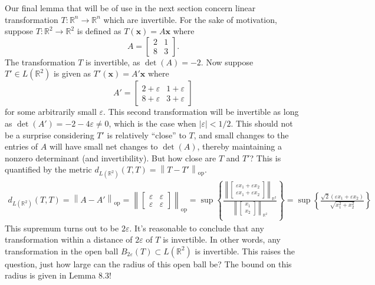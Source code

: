 \documentclass{article}
\newcommand{\R}{\mathbb{R}}
\newcommand{\x}{\mathbf{x}}
\newcommand{\norm}[1]{\left\lVert#1\right\rVert}
\newcommand{\normop}[1]{\left\lVert#1\right\rVert_\text{op}}
\theoremstyle{definition}
\begin{document}
	Our final lemma that will be of use in the next section concern linear transformation $ T:\R^n\to\R^n $ which are invertible. For the sake of motivation, suppose $ T:\R^2\to\R^2 $ is defined as $ T(\x)=A\x $ where 
	$$A = \begin{bmatrix}
		2 & 1 \\ 8 & 3
	\end{bmatrix} .$$ The transformation $ T $ is invertible, as $ \det(A)= -2 $. Now suppose $ T'\in L(\R^2) $ is given as $ T'(\x)=A'\x $ where 
	$$A' = \begin{bmatrix}
		2 +\varepsilon & 1 +\varepsilon\\ 8 +\varepsilon& 3+\varepsilon
	\end{bmatrix} $$ for some arbitrarily small $ \varepsilon $. This second transformation will be invertible as long as $\det(A')= -2 - 4\varepsilon\neq 0$, which is the case when $ |\varepsilon| < 1/2 $. This should not be a surprise considering $ T' $ is relatively ``close'' to $ T $, and small changes to the entries of $ A $ will have small net changes to $ \det(A) $, thereby maintaining a nonzero determinant (and invertibility). But how close are $ T $ and $ T' $? This is quantified by the metric $ d_{L(\R^2)}(T,T)=\normop{T - T'} $. 
	\begin{align*}
		d_{L(\R^2)}(T,T)= \normop{A-A'}  =  \normop{\begin{bmatrix}
				\varepsilon&\varepsilon\\
				\varepsilon& \varepsilon
		\end{bmatrix}} = \sup\left\{\frac{\norm{\begin{bmatrix}
					\varepsilon x_1 + \varepsilon x_2 \\	\varepsilon x_1 + \varepsilon x_2
			\end{bmatrix}}_{\R^2}}{\norm{\begin{bmatrix}
					x_1\\x_2
			\end{bmatrix}}_{\R^2}}\right\} =\sup\left\{\frac{\sqrt{2}(\varepsilon x_1 + \varepsilon x_2)}{\sqrt{x_1^2 + x_2^2}}\right\}
	\end{align*}
	This supremum turns out to be $ 2\varepsilon $. It's reasonable to conclude that any transformation within a distance of $ 2\varepsilon $ of $ T $ is invertible. In other words, any transformation in the open ball $ B_{2\varepsilon}(T)\subset L(\R^2) $ is invertible. This raises the question, just how large can the radius of this open ball be? The bound on this radius is given in Lemma 8.3! 
	
\end{document}
